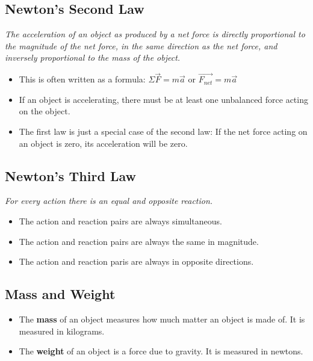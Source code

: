 \documentclass[letterpaper, 12pt]{article}
\begin{document}
\subsection*{Newton's Second Law}
\begin{center}
	\textit{The acceleration of an object as produced by a net force is directly proportional to the magnitude of the net force, in the same direction as the net force, and inversely proportional to the mass of the object.}
\end{center}
	\begin{itemize}
	\item This is often written as a formula: $ \Sigma\vec{F} = m \vec{a}$ or $ \vec{F_{net}} = m \vec{a}$
	\item If an object is accelerating, there must be at least one unbalanced force acting on the object. 
	\item The first law is just a special case of the second law: If the net force acting on an object is zero, its acceleration will be zero. 
\end{itemize}





 

\subsection*{Newton's Third Law}
\begin{center}
	\textit{For every action there is an equal and opposite reaction.}
\end{center}
\begin{itemize}
	\item The action and reaction pairs are always simultaneous.
	\item The action and reaction pairs are always the same in magnitude.
	\item The action and reaction paris are always in opposite directions.
	
\end{itemize}

\subsection*{Mass and Weight}
	\begin{itemize}
		\item The \textbf{mass} of an object measures how much matter an object is made of.  It is measured in kilograms.
		\item The \textbf{weight} of an object is a force due to gravity. It is measured in newtons.
		
	\end{itemize}
\end{document}
